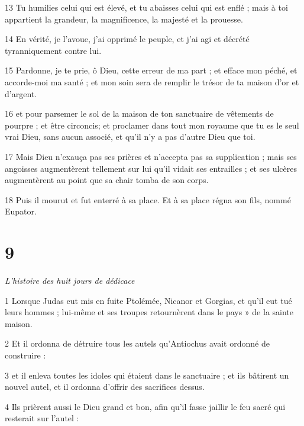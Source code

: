 \par 13 Tu humilies celui qui est élevé, et tu abaisses celui qui est enflé ; mais à toi appartient la grandeur, la magnificence, la majesté et la prouesse.

\par 14 En vérité, je l'avoue, j'ai opprimé le peuple, et j'ai agi et décrété tyranniquement contre lui.

\par 15 Pardonne, je te prie, ô Dieu, cette erreur de ma part ; et efface mon péché, et accorde-moi ma santé ; et mon soin sera de remplir le trésor de ta maison d'or et d'argent.

\par 16 et pour parsemer le sol de la maison de ton sanctuaire de vêtements de pourpre ; et être circoncis; et proclamer dans tout mon royaume que tu es le seul vrai Dieu, sans aucun associé, et qu'il n'y a pas d'autre Dieu que toi.

\par 17 Mais Dieu n'exauça pas ses prières et n'accepta pas sa supplication ; mais ses angoisses augmentèrent tellement sur lui qu'il vidait ses entrailles ; et ses ulcères augmentèrent au point que sa chair tomba de son corps.

\par 18 Puis il mourut et fut enterré à sa place. Et à sa place régna son fils, nommé Eupator.

\chapter{9}

\par \textit{L'histoire des huit jours de dédicace}

\par 1 Lorsque Judas eut mis en fuite Ptolémée, Nicanor et Gorgias, et qu'il eut tué leurs hommes ; lui-même et ses troupes retournèrent dans le pays » de la sainte maison.

\par 2 Et il ordonna de détruire tous les autels qu'Antiochus avait ordonné de construire :

\par 3 et il enleva toutes les idoles qui étaient dans le sanctuaire ; et ils bâtirent un nouvel autel, et il ordonna d'offrir des sacrifices dessus.

\par 4 Ils prièrent aussi le Dieu grand et bon, afin qu'il fasse jaillir le feu sacré qui resterait sur l'autel :

